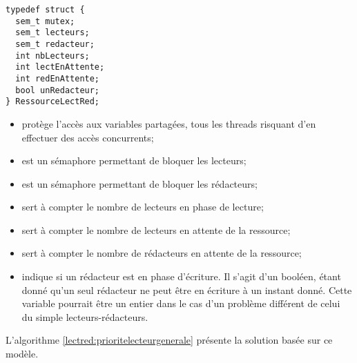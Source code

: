 \begin{lstlisting}
typedef struct {
  sem_t mutex;
  sem_t lecteurs;
  sem_t redacteur;
  int nbLecteurs;
  int lectEnAttente;
  int redEnAttente;
  bool unRedacteur;
} RessourceLectRed;
\end{lstlisting}

\begin{itemize}
\item {} protège l'accès aux variables partagées, tous les threads risquant d'en effectuer des accès concurrents;
\item {} est un sémaphore permettant de bloquer les lecteurs;
\item {} est un sémaphore permettant de bloquer les rédacteurs;
\item {} sert à compter le nombre de lecteurs en phase de lecture;
\item {} sert à compter le nombre de lecteurs en attente de la ressource;
\item {} sert à compter le nombre de rédacteurs en attente de la ressource;
\item {} indique si un rédacteur est en phase d'écriture. Il s'agit d'un booléen, étant donné qu'un seul rédacteur ne peut être en écriture à un instant donné. Cette variable pourrait être un entier dans le cas d'un problème différent de celui du simple lecteurs-rédacteurs.
\end{itemize}

L'algorithme \ref{lectred:prioritelecteurgenerale} présente la solution basée sur ce modèle.

